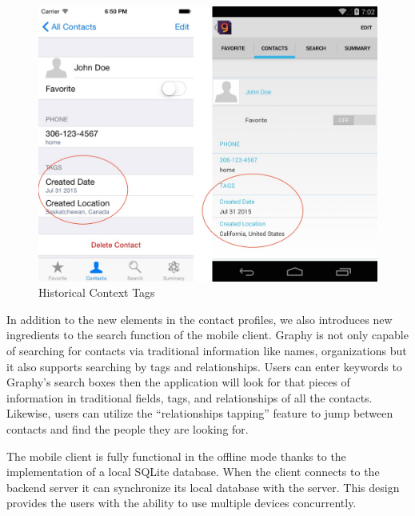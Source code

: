 \begin{figure}[!h]
\begin{centering}
\includegraphics[scale=0.3]{pics/graphy_auto_tag.png}
\caption{Historical Context Tags}\label{fg:/graphy_auto_tag}
\end{centering}
\end{figure}

In addition to the new elements in the contact profiles, we also introduces new ingredients to the search function of the mobile client. Graphy is not only capable of searching for contacts via traditional information like names, organizations but it also supports searching by tags and relationships. Users can enter keywords to Graphy's search boxes then the application will look for that pieces of information in traditional fields, tags, and relationships of all the contacts. Likewise, users can utilize the ``relationships tapping'' feature to jump between contacts and find the people they are looking for. 

The mobile client is fully functional in the offline mode thanks to the implementation of a local SQLite database. When the client connects to the backend server it can synchronize its local database with the server. This design provides the users with the ability to use multiple devices concurrently.

